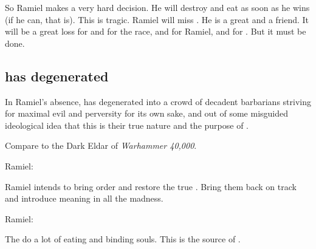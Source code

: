 So Ramiel makes a very hard decision.
He will destroy and eat \Dasteron as soon as he wins (if he can, that is). 
This is tragic.
Ramiel will miss \Dasteron.
He is a great \resphan and a friend.
It will be a great loss for \Mystraacht and for the \resphan race, and for Ramiel, and for \Cishiel.
But it must be done.










\subsection[Mystraacht has degenerated]{\Mystraacht has degenerated}
In Ramiel's absence, \Mystraacht{} has degenerated into a crowd of decadent barbarians striving for maximal evil and perversity for its own sake, and out of some misguided ideological idea that this is their true nature and the purpose of \Mystraacht. 

Compare to the Dark Eldar of \emph{Warhammer 40,000}.

Ramiel: 

Ramiel intends to bring order and restore the true \Mystraacht. 
Bring them back on track and introduce meaning in all the madness. 

Ramiel: 

The \Mystraacht{} do a lot of eating and binding souls. 
This is the source of . 

